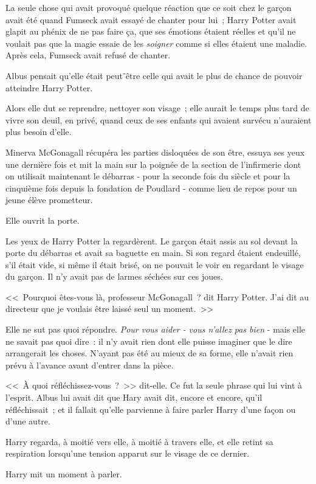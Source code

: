 La seule chose qui avait provoqué quelque réaction que ce soit chez le garçon avait été quand Fumseck avait essayé de chanter pour lui~; Harry Potter avait glapit au phénix de ne pas faire ça, que ses émotions étaient réelles et qu'il ne voulait pas que la magie essaie de les \emph{soigner} comme si elles étaient une maladie. Après cela, Fumseck avait refusé de chanter.

Albus pensait qu'elle était peut⁻être celle qui avait le plus de chance de pouvoir atteindre Harry Potter.

Alors elle dut se reprendre, nettoyer son visage~; elle aurait le temps plus tard de vivre son deuil, en privé, quand ceux de ses enfants qui avaient survécu n'auraient plus besoin d'elle.

Minerva McGonagall récupéra les parties disloquées de son être, essuya ses yeux une dernière fois et mit la main sur la poignée de la section de l'infirmerie dont on utilisait maintenant le débarras - pour la seconde fois du siècle et pour la cinquième fois depuis la fondation de Poudlard - comme lieu de repos pour un jeune élève prometteur.

Elle ouvrit la porte.

Les yeux de Harry Potter la regardèrent. Le garçon était assis au sol devant la porte du débarras et avait sa baguette en main. Si son regard étaient endeuillé, s'il était vide, si même il était brisé, on ne pouvait le voir en regardant le visage du garçon. Il n'y avait pas de larmes séchées sur ces joues.

<<~Pourquoi êtes-vous là, professeur McGonagall~? dit Harry Potter. J'ai dit au directeur que je voulais être laissé seul un moment.~>>

Elle ne sut pas quoi répondre. \emph{Pour vous aider - vous n'allez pas bien} - mais elle ne savait pas quoi dire~: il n'y avait rien dont elle puisse imaginer que le dire arrangerait les choses. N'ayant pas été au mieux de sa forme, elle n'avait rien prévu à l'avance avant d'entrer dans la pièce.

<<~À quoi réfléchissez-vous~?~>> dit-elle. Ce fut la seule phrase qui lui vint à l'esprit. Albus lui avait dit que Hary avait dit, encore et encore, qu'il réfléchissait~; et il fallait qu'elle parvienne à faire parler Harry d'une façon ou d'une autre.

Harry regarda, à moitié vers elle, à moitié à travers elle, et elle retint sa respiration lorsqu'une tension apparut sur le visage de ce dernier.

Harry mit un moment à parler.

